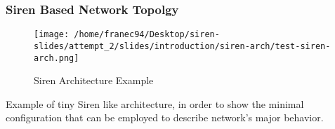 



\begin{frame}
\frametitle{Siren Based Network Topolgy}
\begin{figure}
\texttt{[image: /home/franec94/Desktop/siren-slides/attempt\_2/slides/introduction/siren-arch/test-siren-arch.png]}
\caption{Siren Architecture Example}
\end{figure}
Example of tiny Siren like architecture, in order to show the minimal configuration that can be employed to describe network's major behavior.
\end{frame}
